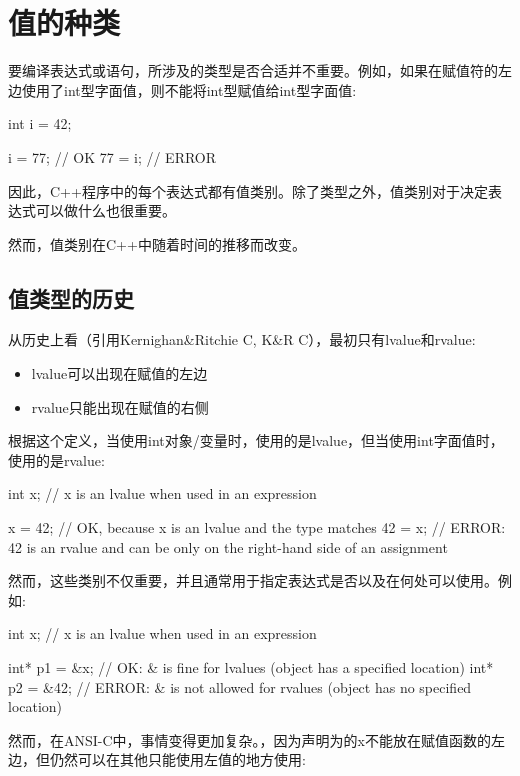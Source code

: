 \section{值的种类}
要编译表达式或语句，所涉及的类型是否合适并不重要。例如，如果在赋值符的左边使用了int型字面值，则不能将int型赋值给int型字面值:

\begin{cppcode}
int i = 42;

i = 77; // OK
77 = i; // ERROR
\end{cppcode}

因此，C++程序中的每个表达式都有值类别。除了类型之外，值类别对于决定表达式可以做什么也很重要。

然而，值类别在C++中随着时间的推移而改变。

\subsection{值类型的历史}

从历史上看（引用Kernighan\&Ritchie C, K\&R C），最初只有lvalue和rvalue:

\begin{itemize}
	\item lvalue可以出现在赋值的左边
	\item rvalue只能出现在赋值的右侧
\end{itemize}

根据这个定义，当使用int对象/变量时，使用的是lvalue，但当使用int字面值时，使用的是rvalue:

\begin{cppcode}
int x; // x is an lvalue when used in an expression

x = 42; // OK, because x is an lvalue and the type matches
42 = x; // ERROR: 42 is an rvalue and can be only on the right-hand side of an assignment
\end{cppcode}

然而，这些类别不仅重要，并且通常用于指定表达式是否以及在何处可以使用。例如:

\begin{cppcode}
int x; // x is an lvalue when used in an expression

int* p1 = &x; // OK: & is fine for lvalues (object has a specified location)
int* p2 = &42; // ERROR: & is not allowed for rvalues (object has no specified location)
\end{cppcode}

然而，在ANSI-C中，事情变得更加复杂。，因为声明为的x不能放在赋值函数的左边，但仍然可以在其他只能使用左值的地方使用:

